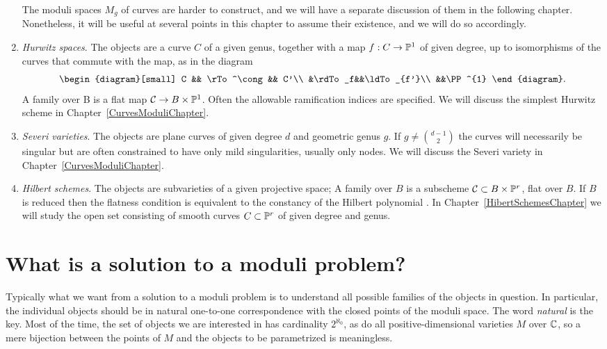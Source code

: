 \begin{enumerate}
The moduli spaces $M_g$ of curves are harder to construct, and we will have a separate discussion of them in the following chapter. Nonetheless, it will be useful at several points in this chapter to assume their existence, and we will do so accordingly.

\item \emph{Hurwitz spaces}. The objects are a curve $C$ of a given genus, together with a map $f: C\to {\mathbb P}^1$ of given degree, up to isomorphisms of the curves that commute with the map, as in the diagram
$$
\begin{diagram}[small]
C && \rTo^\cong && C'\\
&\rdTo_f&&\ldTo_{f'}\\
&&\PP^{1}
\end{diagram}.
$$
A family over B is a flat map $\mathcal C \to B\times {\mathbb P}^{1}$.
 Often the allowable ramification indices are specified. We will discuss the simplest Hurwitz scheme in Chapter~\ref{CurvesModuliChapter}.

\item \emph{Severi varieties}. The objects are plane curves
of given degree $d$ and geometric genus $g$. If $g \neq {d-1\choose 2}$
the curves will necessarily be singular but are often
constrained to have only mild singularities, usually only nodes. We will discuss the Severi variety in Chapter~\ref{CurvesModuliChapter}.

\item \emph{Hilbert schemes}. The objects are subvarieties of a given projective space;   A family over $B$ is a subscheme $\mathcal C \subset B \times {\mathbb P}^r$, flat over $B$. If $B$ is reduced then the flatness condition is equivalent to the  constancy of the Hilbert polynomial \cite[]{Hartshorne1977}. In Chapter~\ref{HibertSchemesChapter} we will study the
open set consisting of smooth curves $C\subset {\mathbb P}^{r}$ of given degree and genus. 


\end{enumerate}

\section{What is a solution to a moduli problem?}

Typically what we want from a solution to a moduli problem is to understand all possible families of the objects
in question. In particular, the individual objects should be in natural one-to-one correspondence with the closed points of the
moduli space.  The word \emph{natural} is the key. Most of the time, the set of objects we are interested in has cardinality $2^{\aleph_0}$, as do all positive-dimensional varieties $M$ over ${\mathbb C}$, so a mere  bijection between the points of $M$ and the objects to be parametrized is meaningless.

